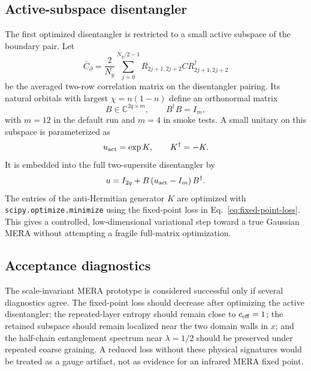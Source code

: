 \documentclass[aps,prb,twocolumn,floatfix]{revtex4-2}
\begin{document}
\subsection{Active-subspace disentangler}

The first optimized disentangler is restricted to a small active subspace of
the boundary pair.  Let
\begin{equation}
  \overline{C}_{\partial}
  =
  \frac{2}{N_y}
  \sum_{j=0}^{N_y/2-1}
  R_{2j+1,2j+2} C R_{2j+1,2j+2}^\dagger
  \label{eq:avg-boundary-c}
\end{equation}
be the averaged two-row correlation matrix on the disentangler pairing.  Its
natural orbitals with largest \(\chi=n(1-n)\) define an orthonormal matrix
\begin{equation}
  B\in\mathbb{C}^{2q\times m},\qquad B^\dagger B=I_m,
\end{equation}
with \(m=12\) in the default run and \(m=4\) in smoke tests.  A small unitary on
this subspace is parameterized as
\begin{equation}
  u_{\rm act}=\exp K,\qquad K^\dagger=-K.
  \label{eq:active-exp}
\end{equation}
It is embedded into the full two-supersite disentangler by
\begin{equation}
  u = I_{2q} + B\left(u_{\rm act}-I_m\right)B^\dagger.
  \label{eq:active-embed}
\end{equation}
The entries of the anti-Hermitian generator \(K\) are optimized with
\texttt{scipy.optimize.minimize} using the fixed-point loss in
Eq.~\eqref{eq:fixed-point-loss}.  This gives a controlled, low-dimensional
variational step toward a true Gaussian MERA without attempting a fragile
full-matrix optimization.

\subsection{Acceptance diagnostics}

The scale-invariant MERA prototype is considered successful only if several
diagnostics agree.  The fixed-point loss should decrease after optimizing the
active disentangler; the repeated-layer entropy should remain close to
\(c_{\rm eff}=1\); the retained subspace should remain localized near the two
domain walls in \(x\); and the half-chain entanglement spectrum near
\(\lambda=1/2\) should be preserved under repeated coarse graining.  A reduced
loss without these physical signatures would be treated as a gauge artifact, not
as evidence for an infrared MERA fixed point.
\end{document}

